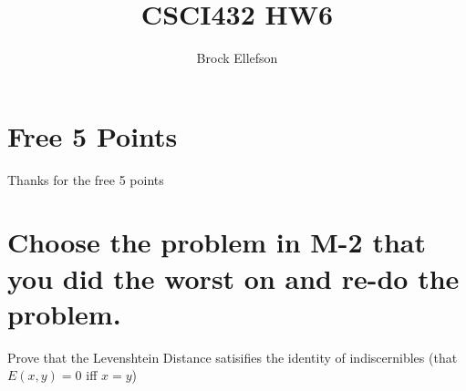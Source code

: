 \documentclass[10pt,a4paper]{article}
\author{Brock Ellefson}
\title{CSCI432 HW6}
\begin{document}
\maketitle
\section{Free 5 Points}
Thanks for the free 5 points
\section{Choose the problem in M-2 that you did the worst on and re-do the problem.}
Prove that the Levenshtein Distance satisifies the identity of indiscernibles (that $E(x,y) = 0$ iff $x=y$)\\
\\
\end{document}
